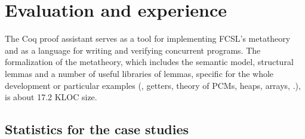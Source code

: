 
\section{Evaluation and experience}
\label{sec:eval-exper}

The Coq proof assistant serves as a tool for implementing FCSL's
metatheory and as a language for writing and verifying concurrent
programs.
%
The formalization of the metatheory, which includes the semantic
model, structural lemmas and a number of useful libraries of lemmas,
specific for the whole development or particular examples (\eg,
getters, theory of PCMs, heaps, arrays, \etc.), is about 17.2 KLOC
size.

\subsection{Statistics for the case studies}
\label{sec:stat-proof-sizes}

